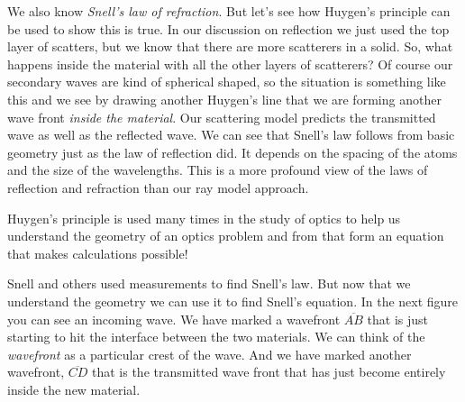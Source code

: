 \documentclass{article}
\begin{document}
We also know \emph{Snell's law of refraction}. But let's see how Huygen's
principle can be used to show this is true. In our discussion on reflection
we just used the top layer of scatters, but we know that there are more
scatterers in a solid. So, what happens inside the
material with all the other layers of scatterers? Of course our secondary
waves are kind of spherical shaped, so the situation is something like this%
and we see by drawing another
Huygen's line that we are forming another wave front \emph{inside the
material}. Our scattering model predicts the transmitted wave as well as the
reflected wave. We can see that Snell's law follows from basic geometry just
as the law of reflection did. It depends on the spacing of the atoms and the
size of the wavelengths. This is a more profound view of the laws of
reflection and refraction than our ray model approach.

Huygen's principle is used many times in the study of optics to help us
understand the geometry of an optics problem and from that form an equation
that makes calculations possible!

Snell and others used measurements to find Snell's law. But now that we
understand the geometry we can use it to find Snell's equation. In the next
figure you can see an incoming wave. We have marked a wavefront $\overline{AB%
}$ that is just starting to hit the interface between the two materials. We
can think of the \emph{wavefront} as a particular crest of the wave. And we
have marked another wavefront, $\overline{CD}$ that is the transmitted wave
front that has just become entirely inside the new material.
\end{document}
